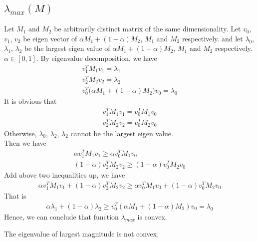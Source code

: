 \documentclass[11pt,a4paper]{article}
\begin{document}
\subsection{$\lambda_{max} (M)$}
Let $M_1$ and $M_2$ be arbitrarily distinct matrix of the same dimensionality.
Let $v_0$, $v_1$, $v_2$ be eigen vector of $\alpha M_1 + (1-\alpha) M_2$,
$M_1$ and $M_2$ respectively. 
and let $\lambda_0$, $\lambda_1$, $\lambda_2$ be the largest eigen value of $\alpha M_1 +
(1-\alpha) M_2$, $M_1$ and $M_2$ respectively. $\alpha \in [0, 1]$. 
By eigenvalue decomposition, we have
\begin{align}
    v_1^T M_1 v_1 = \lambda_1     \\
    v_2^T M_2 v_2 = \lambda_2     \\
    v_0^T \big(\alpha M_1 + (1-\alpha) M_2 \big) v_0 = \lambda_0   
\end{align}
It is obvious that 
\begin{align}
    v_1^T M_1 v_1 = v_0^T M_1 v_0     \\
    v_2^T M_2 v_2 = v_0^T M_2 v_0   
\end{align}
Otherwise, $\lambda_0$, $\lambda_2$, $\lambda_2$ cannot be the largest eigen
value. \\
Then we have
\begin{align}
    \alpha v_1^T M_1 v_1 \geq \alpha v_0^T M_1 v_0     \\
    (1-\alpha) v_2^T M_2 v_2 \geq (1-\alpha) v_0^T M_2 v_0   
\end{align}
Add above two inequalities up, we have
\begin{align}
    \alpha v_1^T M_1 v_1 + (1-\alpha) v_2^T M_2 v_2 
    \geq \alpha v_0^T M_1 v_0  + (1-\alpha) v_0^T M_2 v_0
\end{align}
That is 
\begin{align}
    \alpha \lambda_1 + (1-\alpha) \lambda_2 
    \geq v_0^T(\alpha M_1 + (1-\alpha) M_2) v_0 = \lambda_0
\end{align}
Hence, we can conclude that function $\lambda_{max}$ is convex. \\
\begin{remark}
    The eigenvalue of largest magnitude is not convex.
\end{remark}
\newpage
\end{document}
